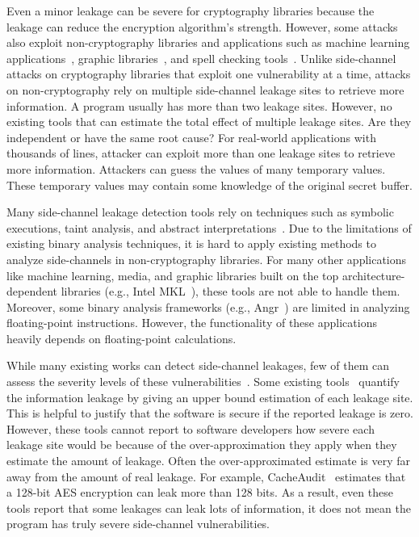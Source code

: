 Even a minor leakage can be severe for cryptography libraries because
the leakage can reduce the encryption algorithm's strength. However,
some attacks also exploit non-cryptography libraries and applications
such as machine learning
applications~\cite{yan2020cache,hong2018security}, graphic
libraries~\cite{wang2019unveiling}, and spell checking
tools~\cite{xu2015controlled}. Unlike side-channel attacks on
cryptography libraries that exploit one vulnerability at a time,
attacks on non-cryptography rely on multiple side-channel leakage
sites to retrieve more information. A program  usually has more than two
leakage sites. However, no existing tools that can estimate the total
effect of multiple leakage sites. Are they independent or have the same root cause? For real-world applications with
thousands of lines, attacker can exploit more than one leakage sites
to retrieve more information. Attackers can guess the values of many temporary
values. These temporary values may contain some knowledge of the
original secret buffer.

Many side-channel leakage detection tools rely on
techniques such as symbolic executions, taint analysis, and abstract interpretations~\cite{203878,182946,Brotzman19Casym,236338}. Due
to the limitations of existing binary analysis techniques, it is hard to apply existing methods to analyze side-channels in non-cryptography
libraries. For many other applications like machine learning, media,
and graphic libraries built on the top architecture-dependent
libraries (e.g., Intel MKL~\cite{wang2014intel}), these tools are not able to
handle them. Moreover, some binary analysis frameworks (e.g.,
Angr~\cite{shoshitaishvili2016state}) are limited in analyzing
floating-point instructions. However, the functionality of these
applications heavily depends on floating-point calculations.

While many existing works can detect side-channel leakages, few
of them can assess the severity levels of these
vulnerabilities~\cite{182946,203878,182946,236338,217537,langley2010ctgrind,xiao2017stacco,wang2019time,Wichelmann:2018:MFF:3274694.3274741,bao2021abacus,236334,wang2021data,sung2018canal}.
Some existing tools~\cite{182946,chattopadhyay2019quantifying, biondi2018scalable,5207642,pasareanu2016multi,AskarovC12,phan2017synthesis} quantify the information leakage by giving an upper
bound estimation of each leakage site.  This is helpful to justify that the software is secure if the reported leakage is zero. However,
these tools cannot report to software developers how severe each leakage site would be because of the over-approximation they apply when they estimate the amount of leakage.  Often the over-approximated estimate is very far away from the amount of real leakage.
For example, CacheAudit~\cite{182946} estimates that a 128-bit
AES encryption can leak more than 128 bits. As a result, even these
tools report that some leakages can leak lots of information, it does not mean the program has truly severe side-channel vulnerabilities. 

